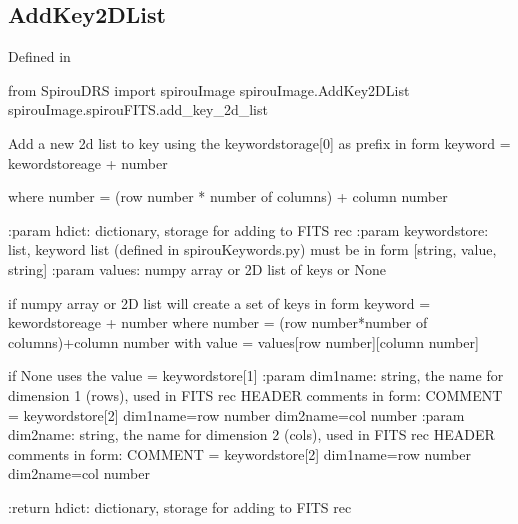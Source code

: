 \noindent\begin{minipage}{\textwidth}
\subsection{AddKey2DList}

Defined in \spirouImage{}

\begin{pythonbox}
from SpirouDRS import spirouImage
spirouImage.AddKey2DList
spirouImage.spirouFITS.add_key_2d_list
\end{pythonbox}

\begin{pythondocstring}
Add a new 2d list to key using the keywordstorage[0] as prefix in form
keyword = kewordstoreage + number

where number = (row number * number of columns) + column number

:param hdict: dictionary, storage for adding to FITS rec
:param keywordstore: list, keyword list (defined in spirouKeywords.py)
                     must be in form [string, value, string]
:param values: numpy array or 2D list of keys or None

              if numpy array or 2D list will create a set of keys in form
              keyword = kewordstoreage + number
              where number = (row number*number of columns)+column number
              with value = values[row number][column number]

              if None uses the value = keywordstore[1]
:param dim1name: string, the name for dimension 1 (rows), used in FITS rec
                 HEADER comments in form:
      COMMENT = keywordstore[2] dim1name={row number} dim2name={col number}
:param dim2name: string, the name for dimension 2 (cols), used in FITS rec
                 HEADER comments in form:
      COMMENT = keywordstore[2] dim1name={row number} dim2name={col number}

:return hdict: dictionary, storage for adding to FITS rec
\end{pythondocstring}
\end{minipage}


